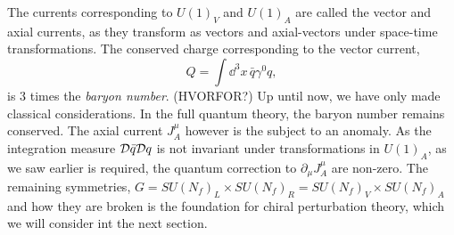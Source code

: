 The currents corresponding to $U(1)_V$ and $U(1)_A$ are called the vector and axial currents, as they transform as vectors and axial-vectors under space-time transformations.
The conserved charge corresponding to the vector current,
\begin{equation}
    Q = \int \dd^3 x \, \bar q \gamma^0 q,
\end{equation}
is $3$ times the \emph{baryon number}. (HVORFOR?)
Up until now, we have only made classical considerations.
In the full quantum theory, the baryon number remains conserved.
The axial current $J^\mu_A$ however is the subject to an anomaly.
As the integration measure $\mathcal{D}\bar q \mathcal{D} q$ is not invariant under transformations in $U(1)_A$, as we saw earlier is required, the quantum correction to $\partial_\mu J^\mu_A$ are non-zero.
The remaining symmetries, $G = SU(N_f)_L \times SU(N_f)_R = SU(N_f)_V \times SU(N_f)_A$ and how they are broken is the foundation for chiral perturbation theory, which we will consider int the next section.
